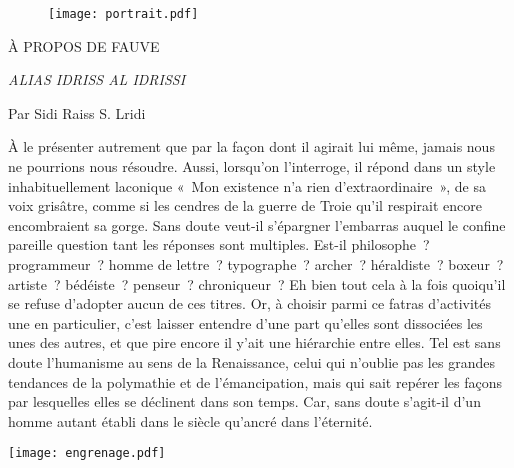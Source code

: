 \newpage
\thispagestyle{empty}
\begin{center}
\begin{figure}[h]
\centering
\texttt{[image: portrait.pdf]}
\captionsetup{labelformat=empty}
\caption[Effigie de Fauve]{}
\end{figure}

\vspace{3pt}

{\Large À PROPOS DE FAUVE}

\vspace{8pt}

{\em ALIAS IDRISS AL IDRISSI}

\vspace{8pt}

{\footnotesize Par Sidi Raiss S. Lridi}

\vspace{10pt}
\end{center}

\shapepar{\authorshape} 
À le présenter autrement que par la façon dont il agirait lui même, jamais nous ne pourrions nous résoudre. Aussi, lorsqu’on l’interroge, il répond dans un style inhabituellement laconique « Mon existence n’a rien d’extraordinaire », de sa voix grisâtre, comme si les cendres de la guerre de Troie qu’il respirait encore encombraient sa gorge. Sans doute veut-il s’épargner l’embarras auquel le confine pareille question tant les réponses sont multiples. Est-il philosophe ? programmeur ? homme de lettre ? typographe ? archer ? héraldiste ? boxeur ? artiste ? bédéiste ? penseur ? chroniqueur ? Eh bien tout cela à la fois quoiqu’il se refuse d’adopter aucun de ces titres. Or, à choisir parmi ce fatras d’activités une en particulier, c’est laisser entendre d’une part qu’elles sont dissociées les unes des autres, et que pire encore il y’ait une hiérarchie entre elles. Tel est sans doute l’humanisme au sens de la Renaissance, celui qui n’oublie pas les grandes tendances de la polymathie et de l’émancipation, mais qui sait repérer les façons par lesquelles elles se déclinent dans son temps.
Car, sans doute s’agit-il d’un homme autant établi dans le siècle qu’ancré dans l’éternité.

\begin{center}
\texttt{[image: engrenage.pdf]}
\end{center}

\restoregeometry
